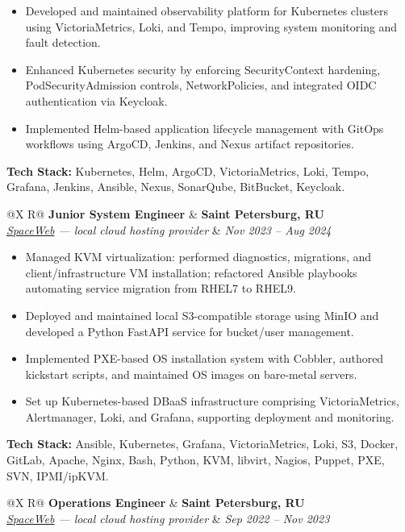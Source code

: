 \documentclass[10pt,a4paper]{article}
\makeatletter
\newcommand{\bulletblock}[1]{%
  \begin{minipage}[t]{\linewidth}\RaggedRight #1\end{minipage}%
}
\newlength{\JobGap}\setlength{\JobGap}{4mm}           %
\newcommand{\rowheader}[4]{%
  \noindent\begin{tabularx}{\textwidth}{@{}X R@{}}
    \textbf{#1} & \textbf{#2} \\
    \textit{#3} & \textit{#4}
  \end{tabularx}\par
}
\newcommand{\jobheader}[4]{%
  \vspace{\JobGap}%
  \rowheader{#1}{#2}{#3}{#4}%
}
\makeatother
\begin{document}
\begin{itemize}
  \item \bulletblock{Developed and maintained observability platform for Kubernetes clusters using VictoriaMetrics, Loki, and Tempo, improving system monitoring and fault detection.}
  \item \bulletblock{Enhanced Kubernetes security by enforcing SecurityContext hardening, PodSecurityAdmission controls, NetworkPolicies, and integrated OIDC authentication via Keycloak.}
  \item \bulletblock{Implemented Helm-based application lifecycle management with GitOps workflows using ArgoCD, Jenkins, and Nexus artifact repositories.}
\end{itemize} \vspace{1mm}
\textbf{Tech Stack:} Kubernetes, Helm, ArgoCD, VictoriaMetrics, Loki, Tempo, Grafana, Jenkins, Ansible, Nexus, SonarQube, BitBucket, Keycloak.

\jobheader{\textbf{Junior System Engineer}}{\textbf{Saint Petersburg, RU}}
{\href{https://sweb.ru}{SpaceWeb} — {\textit{local cloud hosting provider}}}
{Nov 2023 -- Aug 2024}

\begin{itemize}
  \item \bulletblock{Managed KVM virtualization: performed diagnostics, migrations, and client/infrastructure VM installation; refactored Ansible playbooks automating service migration from RHEL7 to RHEL9.}
  \item \bulletblock{Deployed and maintained local S3-compatible storage using MinIO and developed a Python FastAPI service for bucket/user management.}
  \item \bulletblock{Implemented PXE-based OS installation system with Cobbler, authored kickstart scripts, and maintained OS images on bare-metal servers.}
  \item \bulletblock{Set up Kubernetes-based DBaaS infrastructure comprising VictoriaMetrics, Alertmanager, Loki, and Grafana, supporting deployment and monitoring.}
\end{itemize} \vspace{1mm}
\textbf{Tech Stack:} Ansible, Kubernetes, Grafana, VictoriaMetrics, Loki, S3, Docker, GitLab, Apache, Nginx, Bash, Python, KVM, libvirt, Nagios, Puppet, PXE, SVN, IPMI/ipKVM.

\jobheader{\textbf{Operations Engineer}}{\textbf{Saint Petersburg, RU}}
{\href{https://sweb.ru}{SpaceWeb} — {\textit{local cloud hosting provider}}}
{Sep 2022 -- Nov 2023}
\end{document}
